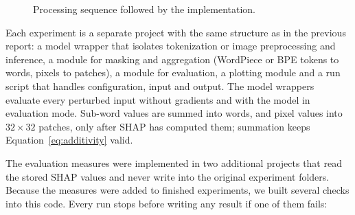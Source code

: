 \documentclass[11pt,a4paper]{article}
\begin{document}
\begin{figure}[htb]
  \centering
  \caption{Processing sequence followed by the implementation.}
  \label{fig:workflow}
\end{figure}

Each experiment is a separate project with the same structure as in the previous report:
a model wrapper that isolates tokenization or image preprocessing and inference, a module
for masking and aggregation (WordPiece or BPE tokens to words, pixels to patches), a module
for evaluation, a plotting module and a run script that handles configuration, input and
output. The model wrappers evaluate every perturbed input without gradients and with the
model in evaluation mode. Sub-word values are summed into words, and pixel values into
$32\times32$ patches, only after SHAP has computed them; summation keeps
Equation~\eqref{eq:additivity} valid.

The evaluation measures were implemented in two additional projects that read the stored
SHAP values and never write into the original experiment folders. Because the measures
were added to finished experiments, we built several checks into this code. Every run
stops before writing any result if one of them fails:
\end{document}
